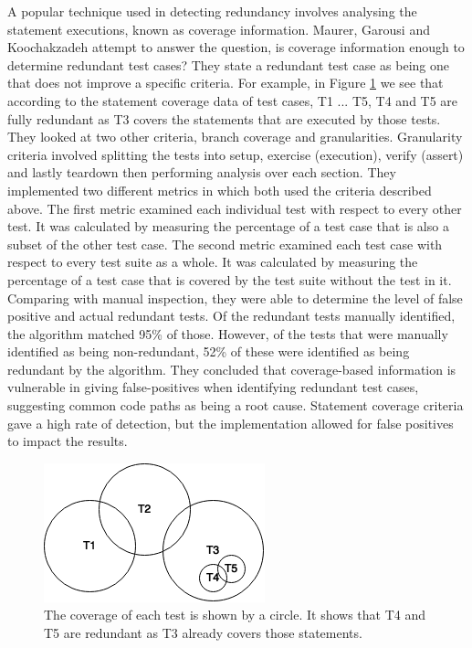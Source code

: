A popular technique used in detecting redundancy involves analysing the statement executions, known as coverage information. Maurer, Garousi and Koochakzadeh \cite{koochakzadeh2009test} attempt to answer the question, is coverage information enough to determine redundant test cases? They state a redundant test case as being one that does not improve a specific criteria. For example, in Figure \ref{fig:venndiagram} we see that according to the statement coverage data of test cases, T1 ... T5, T4 and T5 are fully redundant as T3 covers the statements that are executed by those tests. They looked at two other criteria, branch coverage and granularities. Granularity criteria involved splitting the tests into setup, exercise (execution), verify (assert) and lastly teardown then performing analysis over each section. They implemented two different metrics in which both used the criteria described above. The first metric examined each individual test with respect to every other test. It was calculated by measuring the percentage of a test case that is also a subset of the other test case. The second metric examined each test case with respect to every test suite as a whole. It was calculated by measuring the percentage of a test case that is covered by the test suite without the test in it. Comparing with manual inspection, they were able to determine the level of false positive and actual redundant tests. Of the redundant tests manually identified, the algorithm matched 95\% of those. However, of the tests that were manually identified as being non-redundant, 52\% of these were identified as being redundant by the algorithm. They concluded that coverage-based information is vulnerable in giving false-positives when identifying redundant test cases, suggesting common code paths as being a root cause. Statement coverage criteria gave a high rate of detection, but the implementation allowed for false positives to impact the results. 

\begin{figure}[h]
\begin{center}
\includegraphics[]{VennDiagram.png}
\end{center}
\caption{The coverage of each test is shown by a circle. It shows that T4 and T5 are redundant as T3 already covers those statements.}
\label{fig:venndiagram}
\end{figure}

